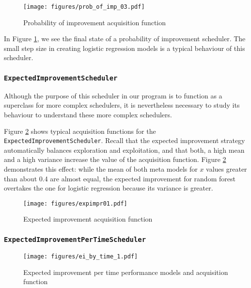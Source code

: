 \documentclass[a4paper,12pt,twoside,openright]{report}
\begin{document}
\begin{figure}
\centering
  \texttt{[image: figures/prob\_of\_imp\_03.pdf]}
  \caption{Probability of improvement acquisition function}
  \label{sched:probofimpr3}
\end{figure}

In Figure \ref{sched:probofimpr3}, we see the final state of a probability of improvement scheduler. The small step size in creating logistic regression models is a typical behaviour of this scheduler. 

\subsubsection{\texttt{ExpectedImprovementScheduler}}

Although the purpose of this scheduler in our program is to function as a superclass for more complex schedulers, it is nevertheless necessary to study its behaviour to understand these more complex schedulers.


Figure \ref{sched:expimpr01} shows typical acquisition functions for the \texttt{ExpectedImprovementScheduler}. Recall that the expected improvement strategy automatically balances exploration and exploitation, and that both, a high mean and a high variance increase the value of the acquisition function. Figure \ref{sched:expimpr01} demonstrates this effect: while the mean of both meta models for $x$ values greater than about 0.4 are almost equal, the expected improvement for random forest overtakes the one for logistic regression because its variance is greater.

\begin{figure}
\centering
  \texttt{[image: figures/expimpr01.pdf]}
  \caption{Expected improvement acquisition function}
  \label{sched:expimpr01}
\end{figure}



\subsubsection{\texttt{ExpectedImprovementPerTimeScheduler}}
\begin{figure}
\centering
  \texttt{[image: figures/ei\_by\_time\_1.pdf]}
  \caption{Expected improvement per time performance models and acquisition function}
  \label{sched:expimprpertime01}
\end{figure}
\end{document}
